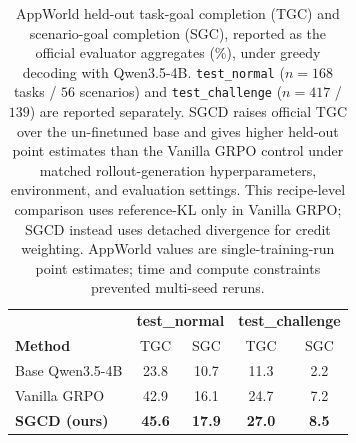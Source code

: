 \providecommand{\venuecompacttablefont}{\scriptsize}

\begin{table}[t]
  \centering
  \small
  \begin{tabular}{lcccc}
    \hline
    & \multicolumn{2}{c}{\textbf{test\_normal}} & \multicolumn{2}{c}{\textbf{test\_challenge}} \\
    \textbf{Method} & TGC & SGC & TGC & SGC \\
    \hline
    Base Qwen3.5-4B          & 23.8 & 10.7 & 11.3 & 2.2 \\
    Vanilla GRPO            & 42.9 & 16.1 & 24.7 & 7.2 \\
    \textbf{SGCD (ours)}     & \textbf{45.6} & \textbf{17.9} & \textbf{27.0} & \textbf{8.5} \\
    \hline
  \end{tabular}
  \caption{AppWorld held-out task-goal completion (TGC) and scenario-goal
    completion (SGC), reported as the official evaluator aggregates (\%), under
    greedy decoding with Qwen3.5-4B. \texttt{test\_normal}
    ($n{=}168$ tasks / $56$ scenarios) and \texttt{test\_challenge}
    ($n{=}417$ / $139$) are reported separately. SGCD raises official TGC over
    the un-finetuned base and gives higher held-out point
    estimates than the Vanilla GRPO control under matched rollout-generation
    hyperparameters, environment, and evaluation settings. This recipe-level
    comparison uses reference-KL only
    in Vanilla GRPO; SGCD instead uses detached divergence for credit weighting.
    AppWorld values are single-training-run point
    estimates; time and compute constraints prevented multi-seed reruns.}
  \label{tab:appworld}
\end{table}


